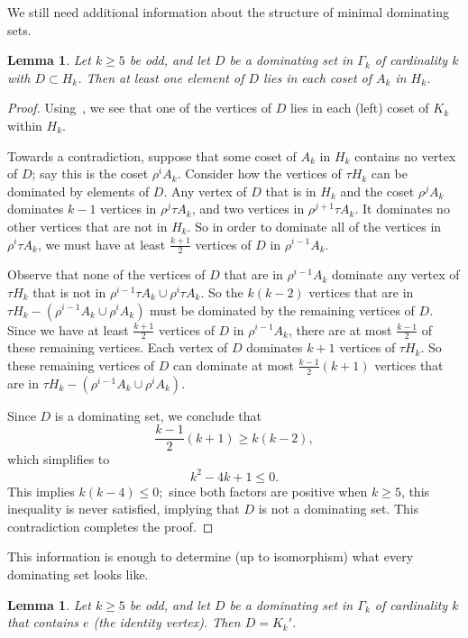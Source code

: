 \documentclass{amsart}
\newtheorem{lem}[thm]{Lemma}
\theoremstyle{remark}
\theoremstyle{definition}
\begin{document}
We still need additional information about the structure of minimal dominating sets.


\begin{lem}\label{cover-rows}
    Let $k \ge 5$ be odd, and let $D$ be a dominating set in $\Gamma_k$ of cardinality $k$ with $D \subset H_k$. Then at least one element of $D$ lies in each coset of $A_k$ in $H_k$.
\end{lem}

\begin{proof}
      Using~, we see that one of the vertices of $D$ lies in each (left) coset of $K_k$ within $H_k$.

    Towards a contradiction, suppose that some coset of $A_k$ in $H_k$ contains no vertex of $D$; say this is the coset $\rho^i A_k$. Consider how the vertices of $\tau H_k$ can be dominated by elements of $D$. Any vertex of $D$ that is in $H_k$ and the coset $\rho^j A_k$ dominates $k-1$ vertices in $\rho^j \tau A_k$, and two vertices in $\rho^{j+1}\tau A_k$. It dominates no other vertices that are not in $H_k$. So in order to dominate all of the vertices in $\rho^i \tau A_k$, we must  have at least $\frac{k+1}{2}$ vertices of $D$ in $\rho^{i-1}A_k$.

    Observe that none of the vertices of $D$ that are in $\rho^{i-1}A_k$ dominate any vertex of $\tau H_k$ that is not in $\rho^{i-1}\tau A_k\cup \rho^i \tau A_k$. So the $k(k-2)$ vertices that are in $\tau H_k -(\rho^{i-1}A_k\cup \rho^i A_k)$ must be dominated by the remaining vertices of $D$. Since we have at least $\frac{k+1}{2}$ vertices of $D$ in $\rho^{i-1}A_k$, there are at most $\frac{k-1}{2}$ of these remaining vertices. Each vertex of $D$ dominates $k+1$ vertices of $\tau H_k$. So these remaining vertices of $D$ can dominate at most $\frac{k-1}{2}(k+1)$ vertices that are in $\tau H_k-(\rho^{i-1}A_k\cup \rho^i A_k)$. 

    Since $D$ is a dominating set, we conclude that $$\frac{k-1}{2}(k+1) \ge k(k-2),$$ which simplifies to $$k^2-4k+1 \le 0.$$ This implies $k(k-4) \le 0;$ since both factors are positive when $k\ge 5$, this inequality is never satisfied, implying that $D$ is not a dominating set. This contradiction completes the proof.
\end{proof}

This information is enough to determine (up to isomorphism) what every dominating set looks like.

\begin{lem}\label{dom-set-types}
    Let $k \ge 5$ be odd, and let $D$ be a dominating set in $\Gamma_k$ of cardinality $k$ that contains $e$ (the identity vertex). Then $D=K_k'$.
\end{lem}
\end{document}
